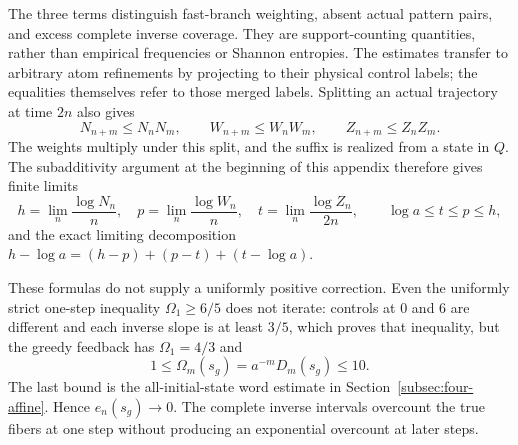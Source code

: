 \documentclass[11pt,reqno]{amsart}
\numberwithin{equation}{section}
\theoremstyle{definition}
\begin{document}
The three terms distinguish fast-branch weighting, absent actual
pattern pairs, and excess complete inverse coverage. They are
support-counting quantities, rather than empirical frequencies
or Shannon entropies. The estimates transfer to arbitrary atom
refinements by projecting to their physical control labels;
the equalities themselves refer to those merged labels.
Splitting an actual trajectory at time $2n$ also gives
\[
 N_{n+m}\le N_nN_m,\qquad W_{n+m}\le W_nW_m,
 \qquad Z_{n+m}\le Z_nZ_m.
\]
The weights multiply under this split, and the suffix is realized
from a state in $Q$. The subadditivity argument at the beginning
of this appendix therefore gives finite limits
\[
 h=\lim_n\frac{\log N_n}{n},\quad
 p=\lim_n\frac{\log W_n}{n},\quad
 t=\lim_n\frac{\log Z_n}{2n},\qquad
 \log a\le t\le p\le h,
\]
and the exact limiting decomposition
$h-\log a=(h-p)+(p-t)+(t-\log a)$.

These formulas do not supply a uniformly positive correction.
Even the uniformly strict one-step inequality
$\Omega_1\ge6/5$ does not iterate: controls at $0$ and $6$
are different and each inverse slope is at least $3/5$, which
proves that inequality, but the greedy feedback has
$\Omega_1=4/3$ and
\[
 1\le\Omega_m(s_g)=a^{-m}D_m(s_g)\le10.
\]
The last bound is the all-initial-state word estimate in
Section~\ref{subsec:four-affine}. Hence $e_n(s_g)\to0$.
The complete inverse intervals overcount the true fibers at one
step without producing an exponential overcount at later steps.
\end{document}
